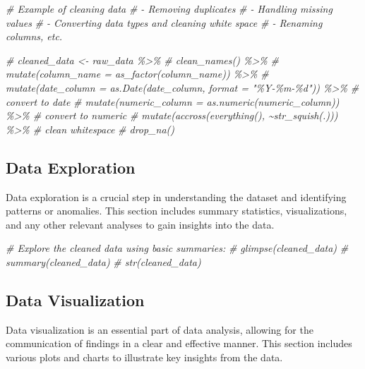 \documentclass[
]{article}
\newenvironment{Shaded}{\begin{snugshade}}{\end{snugshade}}
\newcommand{\CommentTok}[1]{\textcolor[rgb]{0.56,0.35,0.01}{\textit{#1}}}
\begin{document}
\begin{Shaded}
\begin{Highlighting}[]
\CommentTok{\# Example of cleaning data}
\CommentTok{\# {-} Removing duplicates}
\CommentTok{\# {-} Handling missing values}
\CommentTok{\# {-} Converting data types and cleaning white space}
\CommentTok{\# {-} Renaming columns, etc.}

\CommentTok{\# cleaned\_data \textless{}{-} raw\_data \%\textgreater{}\%}
\CommentTok{\#   clean\_names() \%\textgreater{}\%}
\CommentTok{\#   mutate(column\_name = as\_factor(column\_name)) \%\textgreater{}\% }
\CommentTok{\#   mutate(date\_column = as.Date(date\_column, format = "\%Y{-}\%m{-}\%d")) \%\textgreater{}\% \# convert to date}
\CommentTok{\#   mutate(numeric\_column = as.numeric(numeric\_column)) \%\textgreater{}\% \# convert to numeric}
\CommentTok{\#   mutate(accross(everything(), \textasciitilde{}str\_squish(.))) \%\textgreater{}\% \# clean whitespace}
\CommentTok{\#   drop\_na()}
\end{Highlighting}
\end{Shaded}

\subsection{Data Exploration}\label{data-exploration}

Data exploration is a crucial step in understanding the dataset and
identifying patterns or anomalies. This section includes summary
statistics, visualizations, and any other relevant analyses to gain
insights into the data.

\begin{Shaded}
\begin{Highlighting}[]
\CommentTok{\# Explore the cleaned data using basic summaries:}
\CommentTok{\# glimpse(cleaned\_data)}
\CommentTok{\# summary(cleaned\_data)}
\CommentTok{\# str(cleaned\_data)}
\end{Highlighting}
\end{Shaded}

\subsection{Data Visualization}\label{data-visualization}

Data visualization is an essential part of data analysis, allowing for
the communication of findings in a clear and effective manner. This
section includes various plots and charts to illustrate key insights
from the data.
\end{document}
